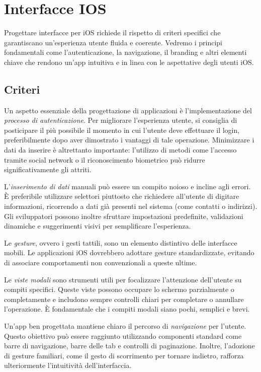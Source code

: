 \section{Interfacce IOS}
Progettare interfacce per iOS richiede il rispetto di criteri specifici che garantiscano un’esperienza utente fluida e coerente. Vedremo i principi fondamentali come l’autenticazione, la navigazione, il branding e altri elementi chiave che rendono un’app intuitiva e in linea con le aspettative degli utenti iOS.

\subsection{Criteri}
Un aspetto essenziale della progettazione di applicazioni è l’implementazione del \textit{processo di autenticazione}. Per migliorare l’esperienza utente, si consiglia di posticipare il più possibile il momento in cui l’utente deve effettuare il login, preferibilmente dopo aver dimostrato i vantaggi di tale operazione. Minimizzare i dati da inserire è altrettanto importante: l’utilizzo di metodi come l’accesso tramite social network o il riconoscimento biometrico può ridurre significativamente gli attriti.

L’\textit{inserimento di dati} manuali può essere un compito noioso e incline agli errori. È preferibile utilizzare selettori piuttosto che richiedere all’utente di digitare informazioni, ricorrendo a dati già presenti nel sistema (come contatti o indirizzi). Gli sviluppatori possono inoltre sfruttare impostazioni predefinite, validazioni dinamiche e suggerimenti visivi per semplificare l’esperienza.

Le \textit{gesture}, ovvero i gesti tattili, sono un elemento distintivo delle interfacce mobili. Le applicazioni iOS dovrebbero adottare gesture standardizzate, evitando di associare comportamenti non convenzionali a queste ultime. 

Le \textit{viste modali} sono strumenti utili per focalizzare l’attenzione dell’utente su compiti specifici. Queste viste possono occupare lo schermo parzialmente o completamente e includono sempre controlli chiari per completare o annullare l’operazione. È fondamentale che i compiti modali siano pochi, semplici e brevi.

Un’app ben progettata mantiene chiaro il percorso di \textit{navigazione} per l’utente. Questo obiettivo può essere raggiunto utilizzando componenti standard come barre di navigazione, barre delle tab e controlli di paginazione. Inoltre, l’adozione di gesture familiari, come il gesto di scorrimento per tornare indietro, rafforza ulteriormente l’intuitività dell’interfaccia.

